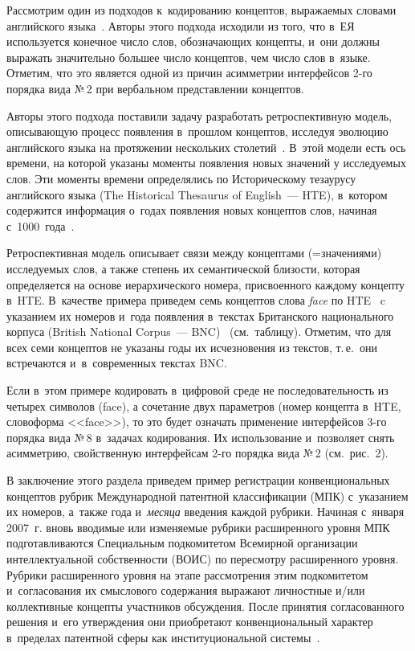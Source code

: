\begin{multicols}{2}
  Рассмотрим один из подходов к~кодированию концептов, выражаемых 
словами английского языка~\cite{24-zac}. Авторы этого подхода исходили из 
того, что в~ЕЯ используется конечное чис\-ло слов, 
обозначающих концепты, и~они должны выражать значительно большее чис\-ло 
концептов, чем чис\-ло слов в~языке. Отметим, что это является одной из причин 
асимметрии интерфейсов 2-го порядка вида №\,2 при вербальном 
пред\-став\-ле\-нии концептов.
  
  Авторы этого подхода поставили задачу разработать ретроспективную 
модель, описывающую процесс появления в~прошлом концептов, исследуя 
эволюцию английского языка на протяжении нескольких  
столетий~\cite{24-zac}. В~этой модели есть ось времени, на которой указаны 
моменты появления новых значений у исследуемых слов. Эти моменты 
времени определялись по Историческому тезаурусу английского языка (The 
Historical Thesaurus of English~--- HTE), в~котором содержится информация 
о~годах появления новых концептов слов, начиная с~1000~года~\cite{25-zac}.
  
  Ретроспективная модель описывает связи между концептами  
(=\;зна\-че\-ни\-ями) исследуемых слов, а также степень их семантической 
близости, которая определяется на основе иерархического номера, 
присвоенного каждому концепту в~HTE. В~качестве примера приведем семь 
концептов слова \textit{face} по HTE~\cite{26-zac} c указанием их номеров 
и~года появления в~текстах Британского национального корпуса (British National 
Corpus~--- BNC)~\cite{27-zac} (см.\ таблицу). Отметим, что для всех семи концептов 
не указаны годы их исчезновения из текстов, т.\,е.\ они встречаются 
и~в~современных текстах BNC.
  

   
  Если в~этом примере кодировать в~цифровой среде не последовательность из 
четырех символов (face), а сочетание двух параметров (номер концепта в~HTE, 
словоформа <<face>>), то это будет означать применение интерфейсов 3-го 
порядка вида №\,8 в~задачах кодирования. Их использование и~позволяет снять 
асимметрию, свойственную интерфейсам 2-го порядка вида №\,2 (см.\ рис.~2).
  
  В заключение этого раздела приведем пример регистрации 
конвенциональных концептов рубрик Международной патентной 
классификации (МПК) с~указанием их номеров, а~также года и~\textit{месяца}\linebreak 
введения каждой рубрики. Начиная с~января 2007~г.\linebreak
 вновь вводимые или 
изменяемые рубрики рас\-ширенного уровня МПК подготавливаются 
Спе\-циальным подкомитетом Всемирной организации интеллектуальной 
собственности (ВОИС) по пере\-смот\-ру расширенного уровня. Рубрики 
расширенного уровня на этапе рассмотрения этим подкомитетом 
и~согласования их смыслового содержания выражают личностные и/или 
коллективные концепты участников обсуждения. После принятия 
согласованного решения и~его утверждения они приобретают 
конвенциональный характер в~пределах патентной сферы как 
институциональной сис\-те\-мы~\cite{1-zac}.
  

\end{multicols}
